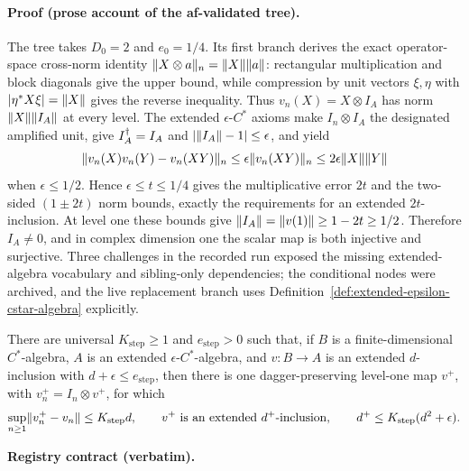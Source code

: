 \paragraph{Proof (prose account of the af-validated tree).}
The tree takes $D_{0}=2$ and $e_{0}=1/4$.  Its first branch derives the exact
operator-space cross-norm identity
$\lVert X\otimes a\rVert_{n}=\lVert X\rVert\lVert a\rVert$: rectangular multiplication and block diagonals
give the upper bound, while compression by unit vectors $\xi,\eta$ with
$|\eta^{*}X\xi|=\lVert X\rVert$ gives the reverse inequality.  Thus
$v_n(X)=X\otimes I_A$ has norm $\lVert X\rVert\lVert I_A\rVert$ at every level.  The extended
$\epsilon$-$C^{*}$ axioms make $I_n\otimes I_A$ the designated amplified unit,
give $I_A^{\dagger}=I_A$ and $|\lVert I_A\rVert-1|\le\epsilon$, and yield
\[
 \lVert v_n(X)v_n(Y)-v_n(XY)\rVert_n
 \le \epsilon\lVert v_n(XY)\rVert_n
 \le 2\epsilon\lVert X\rVert\lVert Y\rVert
\]
when $\epsilon\le1/2$.  Hence $\epsilon\le t\le1/4$ gives the multiplicative
error $2t$ and the two-sided $(1\pm2t)$ norm bounds, exactly the requirements
for an extended $2t$-inclusion.  At level one these bounds give
$\lVert I_A\rVert=\lVert v(1)\rVert\ge1-2t\ge1/2$.  Therefore $I_A\ne0$, and in complex
dimension one the scalar map is both injective and surjective.  Three challenges in
the recorded run exposed the missing extended-algebra vocabulary and sibling-only
dependencies; the conditional nodes were archived, and the live replacement branch
uses Definition~\ref{def:extended-epsilon-cstar-algebra} explicitly.

\begin{lemma}\label{lem:maincb-improvement-one-step}
There are universal $K_{\mathrm{step}}\ge1$ and $e_{\mathrm{step}}>0$ such that,
if $B$ is a finite-dimensional $C^{*}$-algebra, $A$ is an extended
$\epsilon$-$C^{*}$-algebra, and $v:B\to A$ is an extended $d$-inclusion with
$d+\epsilon\le e_{\mathrm{step}}$, then there is one dagger-preserving level-one
map $v^{+}$, with $v_n^{+}=I_n\otimes v^{+}$, for which
\[
 \sup_{n\ge1}\lVert v_n^{+}-v_n\rVert\le K_{\mathrm{step}}d,
 \qquad v^{+}\text{ is an extended }d^{+}\text{-inclusion},\qquad
 d^{+}\le K_{\mathrm{step}}(d^{2}+\epsilon).
\]
\end{lemma}

\noindent\textbf{Registry contract (verbatim).}

